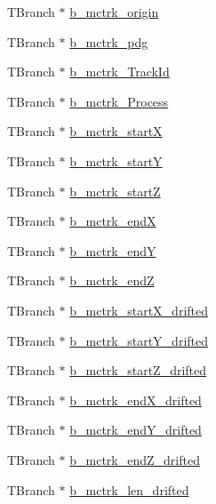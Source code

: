 \begin{DoxyCompactItemize}
\item 
T\-Branch $\ast$ \hyperlink{classanatree_abb721fc157c14dfc822bc3cdb0ad57ca}{b\-\_\-mctrk\-\_\-origin}
\item 
T\-Branch $\ast$ \hyperlink{classanatree_a31e92e32f30f697fddc8b466caabf896}{b\-\_\-mctrk\-\_\-pdg}
\item 
T\-Branch $\ast$ \hyperlink{classanatree_a2eebb498ef914a493a8e449295f2c284}{b\-\_\-mctrk\-\_\-\-Track\-Id}
\item 
T\-Branch $\ast$ \hyperlink{classanatree_a7dde4e8b9c46b3278df1b0a36b8a3e9d}{b\-\_\-mctrk\-\_\-\-Process}
\item 
T\-Branch $\ast$ \hyperlink{classanatree_a3985f86e1fc2b26e4668dbdc7744774f}{b\-\_\-mctrk\-\_\-start\-X}
\item 
T\-Branch $\ast$ \hyperlink{classanatree_af7ff16eb047ee9c2f240f5f537906623}{b\-\_\-mctrk\-\_\-start\-Y}
\item 
T\-Branch $\ast$ \hyperlink{classanatree_ad05ca0ede41f59d19ae872017e5ce2dc}{b\-\_\-mctrk\-\_\-start\-Z}
\item 
T\-Branch $\ast$ \hyperlink{classanatree_a97d04b995e456e2cbd2a987db13c9889}{b\-\_\-mctrk\-\_\-end\-X}
\item 
T\-Branch $\ast$ \hyperlink{classanatree_a00c93992455d29eef985b9fa379dd8f2}{b\-\_\-mctrk\-\_\-end\-Y}
\item 
T\-Branch $\ast$ \hyperlink{classanatree_ab94f17c6ce8123a8c7c6a8107eb42e43}{b\-\_\-mctrk\-\_\-end\-Z}
\item 
T\-Branch $\ast$ \hyperlink{classanatree_a7d2896a7cabfab099ecbbe61366ed72c}{b\-\_\-mctrk\-\_\-start\-X\-\_\-drifted}
\item 
T\-Branch $\ast$ \hyperlink{classanatree_ace0b1f90992660ae0717fda21f69953b}{b\-\_\-mctrk\-\_\-start\-Y\-\_\-drifted}
\item 
T\-Branch $\ast$ \hyperlink{classanatree_a861718f52eb8d211359232fa5f7e9eb9}{b\-\_\-mctrk\-\_\-start\-Z\-\_\-drifted}
\item 
T\-Branch $\ast$ \hyperlink{classanatree_a04228625a794fd62d1cb36a4f1c11d0a}{b\-\_\-mctrk\-\_\-end\-X\-\_\-drifted}
\item 
T\-Branch $\ast$ \hyperlink{classanatree_a8dd7b58254f69ea9451197ddba3c4b60}{b\-\_\-mctrk\-\_\-end\-Y\-\_\-drifted}
\item 
T\-Branch $\ast$ \hyperlink{classanatree_abcaf0bbfbd71ed2440d10ee32dac04fb}{b\-\_\-mctrk\-\_\-end\-Z\-\_\-drifted}
\item 
T\-Branch $\ast$ \hyperlink{classanatree_af2ad6142ab028bde107c9fda85406372}{b\-\_\-mctrk\-\_\-len\-\_\-drifted}

\end{DoxyCompactItemize}
